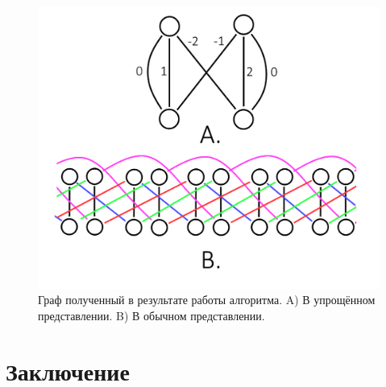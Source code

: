 \documentclass[14pt]{mmcs_article}
\begin{document}
\begin{figure}[H]
  \centering
  \includegraphics[scale=0.5]{Fig_7.png}
  \caption{ Граф полученный в результате работы алгоритма. A) В упрощённом представлении. B) В обычном представлении. }
  \label{stud:fig:7}
\end{figure}

\newpage
{}
\section*{Заключение}


\newpage

\renewcommand{\refname}{\centering \textbf{Литература}}
\end{document}
